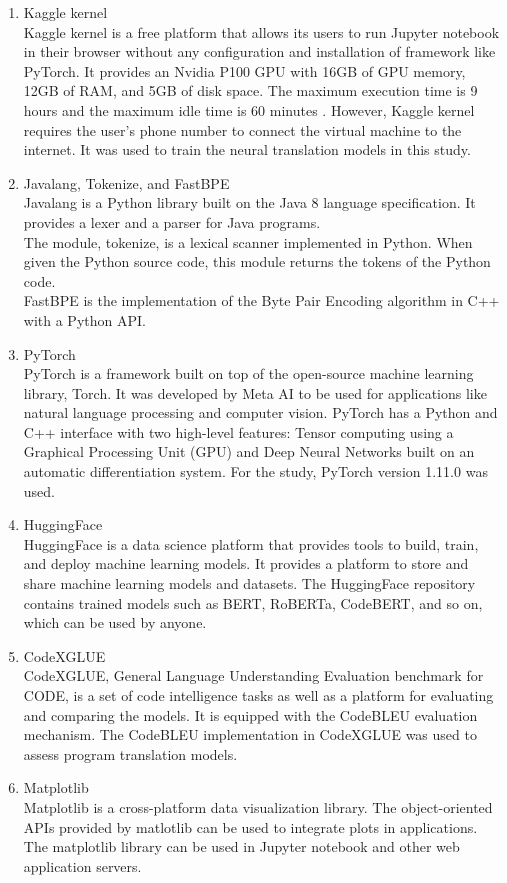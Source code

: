 \begin{enumerate}[topsep = 0pt, label=\roman*.]
\item Kaggle kernel \\
Kaggle kernel is a free platform that allows its users to run Jupyter notebook in their browser without any configuration and installation of framework like PyTorch. It provides an Nvidia P100 GPU with 16GB of GPU memory, 12GB of RAM, and 5GB of disk space. The maximum execution time is 9 hours and the maximum idle time is 60 minutes \cite{kazemnejad_2019}. However, Kaggle kernel requires the user’s phone number to connect the virtual machine to the internet. It was used to train the neural translation models in this study.

\item Javalang, Tokenize, and FastBPE \\
Javalang is a Python library built on the Java 8 language specification. It provides a lexer and a parser for Java programs.
\\
The module, tokenize, is a lexical scanner implemented in Python. When given the Python source code, this module returns the tokens of the Python code.
\\
FastBPE is the implementation of the Byte Pair Encoding algorithm in C++ with a Python API.

\item PyTorch \\
PyTorch is a framework built on top of the open-source machine learning library, Torch. It was developed by Meta AI to be used for applications like natural language processing and computer vision. PyTorch has a Python and C++ interface with two high-level features: Tensor computing using a Graphical Processing Unit (GPU) and Deep Neural Networks built on an automatic differentiation system. For the study, PyTorch version 1.11.0 was used.

\item HuggingFace \\
HuggingFace is a data science platform that provides tools to build, train, and deploy machine learning models. It provides a platform to store and share machine learning models and datasets. The HuggingFace repository contains trained models such as BERT, RoBERTa, CodeBERT, and so on, which can be used by anyone.

\item CodeXGLUE \\
CodeXGLUE, General Language Understanding Evaluation benchmark for CODE, is a set of code intelligence tasks as well as a platform for evaluating and comparing the models. It is equipped with the CodeBLEU evaluation mechanism. The CodeBLEU implementation in CodeXGLUE was used to assess program translation models.

\item Matplotlib \\
Matplotlib is a cross-platform data visualization library. The object-oriented APIs provided by matlotlib can be used to integrate plots in applications. The matplotlib library can be used in Jupyter notebook and other web application servers.
\end{enumerate}

